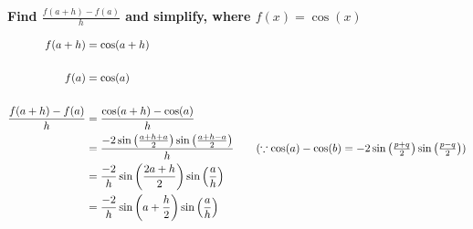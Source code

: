 \documentclass[crop=false,fleqn]{standalone}
\begin{document}
    \textbf{Find $\frac{f(a+h)-f(a)}{h}$ and simplify, where $f(x)=\cos(x)$}

    \begin{align*}
        f(a+h) &= \cos(a+h) \\
        \\
        f(a) &= \cos(a) \\
        \\
        \frac{f(a+h)-f(a)}{h} &= \frac{\cos(a+h) - \cos(a)}{h} \\
            &= \frac{-2 \sin\left(\frac{a+h+a}{2}\right) \sin\left(\frac{a+h-a}{2}\right)}{h}
                \tag{$
                    \because \cos(a) - \cos(b) = -2
                    \sin\left(\frac{p+q}{2}\right)
                    \sin\left(\frac{p-q}{2}\right)
                $} \\
            &= \frac{-2}{h} \sin\left(\frac{2a+h}{2}\right) \sin\left(\frac{a}{h}\right) \\
            &= \frac{-2}{h} \sin\left(a+\frac{h}{2}\right) \sin\left(\frac{a}{h}\right)
    \end{align*}
\end{document}
